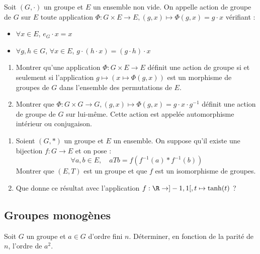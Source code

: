 \begin{exercice}
    Soit $(G, \cdot)$ un groupe et $E$ un ensemble non vide.
    On appelle action de groupe de $G$ sur $E$ toute application $\Phi: G\times E \to E, (g,x) \mapsto \Phi(g,x)=g \cdot x$ vérifiant :
    \begin{itemize}
        \item $\forall x\in E$, $e_{G} \cdot x=x$
        \item $\forall g,h\in G$, $\forall x\in E$, $g \cdot (h \cdot x)=(g \cdot h) \cdot x$
    \end{itemize}
    \begin{enumerate}
        \item Montrer qu'une application $\Phi:G\times E\rightarrow E$ définit une action de groupe 
            si et seulement si l'application $g\mapsto(x\mapsto\Phi(g,x))$ est un morphisme de groupes de $G$ dans l'ensemble des permutations de $E$.
        \item Montrer que $\Phi: G\times G \to G, (g,x) \mapsto \Phi(g,x)=g \cdot x \cdot g^{-1}$ définit une action de groupe de $G$ sur lui-même. 
            Cette action est appelée automorphisme intérieur ou conjugaison.
    \end{enumerate}
\end{exercice}

\begin{exercice}
    \begin{enumerate}
        \item Soient $(G,*)$ un groupe et $E$ un ensemble. On suppose qu'il existe une bijection $f:G\rightarrow E$ et on pose :
            \[\forall a,b\in E, \quad a T b=f(f^{-1}(a)*f^{-1}(b))\]
            Montrer que $(E,T)$ est un groupe et que $f$ est un isomorphisme de groupes.
        \item Que donne ce résultat avec l'application $f: \R \to ]-1,1[, t \mapsto \tanh(t)$ ?
    \end{enumerate}
\end{exercice}

\subsection{Groupes monogènes}

\begin{exercice}
    Soit $G$ un groupe et $a\in G$ d'ordre fini $n$.
    Déterminer, en fonction de la parité de $n$, l'ordre de $a^{2}$.
\end{exercice}

